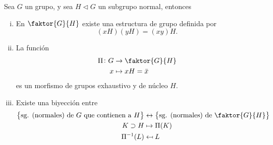 \begin{prop}
    Sea $G$ un grupo, y sea $H \triangleleft G$ un subgrupo normal, entonces
    \begin{enumerate}[i)]
        \item En $\faktor{G}{H}$ existe una estructura de grupo definida por 
            \[
                (xH)(yH) = (xy)H.
            \]
        \item La función
            \[
                \begin{aligned}
                    \Pi \colon G &\to  \faktor{G}{H} \\
                    x &\mapsto xH = \bar{x}
                \end{aligned}
            \]
            es un morfismo de grupos exhaustivo y de núcleo $H$.
        \item Existe una biyección entre
            \[
                \begin{aligned}
                    \setb{ \text{sg. (normales) de $G$ que contienen a $H$}} &\leftrightarrow
                    \setb{ \text{sg. (normales) de $\faktor{G}{H}$}} \\
                    K \supset H &\mapsto \Pi(K) \\
                    \Pi^{-1}(L) &\mapsfrom L
                \end{aligned}
            \]
    \end{enumerate}
\end{prop}

